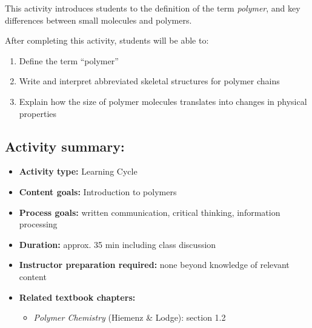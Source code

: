%
%
%
%

\renewcommand{\figpath}{content/intro/molecules-to-polymers/figs}
\renewcommand{\labelbase}{molecules-to-polymers}

\begin{activity}

\begin{instructornotes}

	This activity introduces students to the definition of the term \emph{polymer}, and key differences between small molecules and polymers.
	
	After completing this activity, students will be able to:
			\begin{enumerate}
				\item Define the term ``polymer''
				\item Write and interpret abbreviated skeletal structures for polymer chains
				\item Explain how the size of polymer molecules translates into changes in physical properties
			\end{enumerate}
			
	\subsection*{Activity summary:}
	\begin{itemize}
		\item \textbf{Activity type:} Learning Cycle
		\item \textbf{Content goals:} Introduction to polymers
		\item \textbf{Process goals:} %
			written communication, critical thinking, information processing
		\item \textbf{Duration:} approx. 35 min including class discussion
	
		\item \textbf{Instructor preparation required:} none beyond knowledge of relevant content
		\item \textbf{Related textbook chapters:}
			\begin{itemize}
				\item \emph{Polymer Chemistry} (Hiemenz \& Lodge): section 1.2
			\end{itemize}
	\end{itemize}


\end{instructornotes}
\end{activity}
